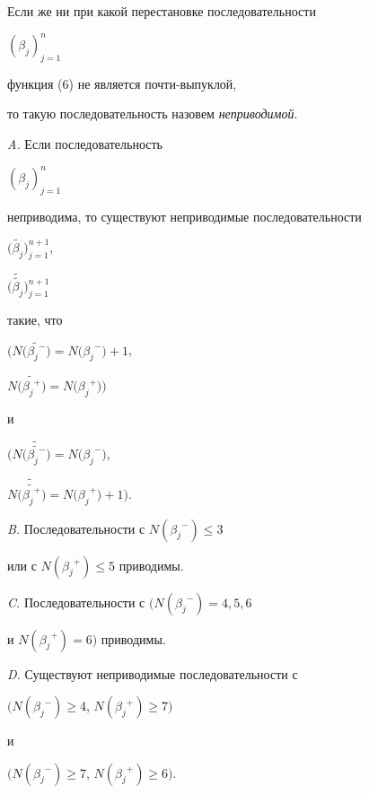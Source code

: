 

Если же ни при какой перестановке последовательности


$(\beta _{j})_{j=1}^{n}$


функция (6) не является почти-выпуклой,


то такую последовательность назовем {\em неприводимой}.





\begin{lemnonum}


{\em A.} Если последовательность


$(\beta _{j})_{j=1}^{n}$


неприводима, то существуют неприводимые последовательности


$\bigl (\widetilde{{\beta_{j}}}\bigr)_{j=1}^{n+1}$,


$\bigl (\widetilde{\widetilde{\beta _{j} }}\bigr )_{j=1}^{n+1}$


такие, что


$\bigl(N\bigl(\widetilde{{\beta _{j}}^{-}}\bigr )=


N\bigl({\beta _{j}}^{-}\bigr)+1$,


$N\bigl(\widetilde{{\beta _{j}}^{+}}\bigr)=


N\bigl({\beta_{j}}^{+}\bigr)\bigr)$


и


$\bigl(N\bigl(\widetilde{\widetilde{{\beta _{j}}^{-}}}\bigr)=


N\bigl({\beta_{j} }^{-}\bigr)$,


$N\bigl(\widetilde{\widetilde{{\beta _{j}}^{+}}}\bigr)=


N\bigl({\beta _{j} }^{+}\bigr)+1\bigr)$.





\noindent


{\em B.} Последовательности с $N({\beta _{j} }^{-} ) \le 3$


или с $N({\beta _{j} }^{+} ) \le 5$ приводимы.





\noindent


{\em C.} Последовательности с $(N({\beta_j}^-)=4,5,6$


и $N({\beta_j}^+)=6)$ приводимы.





\noindent


{\em D.} Существуют неприводимые последовательности с 


$(N({\beta_{j} }^{-} )\ge 4$, $N({\beta_{j} }^{+} )\ge 7)$


и


$(N({\beta_{j}}^{-})\ge 7$, $N({\beta_{j} }^{+})\ge 6)$.


\end{lemnonum}





